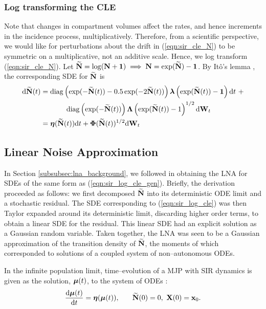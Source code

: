 \subsubsection{Log transforming the CLE}
\label{subsubsec:log_cle}
Note that changes in compartment volumes affect the rates, and hence increments in the incidence process, multiplicatively. Therefore, from a scientific perspective, we would like for perturbations about the drift in (\ref{eqn:sir_cle_N}) to be symmetric on a multiplicative, not an additive scale. Hence, we log transform (\ref{eqn:sir_cle_N}). Let $ \widetilde{\mathbf{N}} = \log(\mathbf{N} + \boldsymbol{1}) \implies\mathbf{N} = \exp(\widetilde{\mathbf{N}}) - \boldsymbol{1}$. By It\^{o}'s lemma \cite{oksendal2003stochastic}, the corresponding SDE for $ \widetilde{\mathbf{N}} $ is 
	\begin{align}
\label{eqn:sir_log_cle}
\mathrm{d}\widetilde{\mathbf{N}}(t) &= \mathrm{diag}\left (\exp(-\widetilde{\mathbf{N}}(t)) - 0.5\exp(-2\widetilde{\mathbf{N}}(t))\right )\boldsymbol{\lambda}\left (\exp(\widetilde{\mathbf{N}}(t))-\boldsymbol{1}\right )\mathrm{d} t\ + \nonumber\\
& \hspace{0.5in} \mathrm{diag}\left (\exp(-\widetilde{\mathbf{N}}(t))\right )\boldsymbol{\Lambda}\left (\exp(\widetilde{\mathbf{N}}(t))-1\right )^{1/2}\mathrm{d}\mathbf{W}_t \\
\label{eqn:sir_log_cle_gen}
&= \boldsymbol{\eta}(\widetilde{\mathbf{N}}(t))\mathrm{d} t + \boldsymbol{\Phi}(\widetilde{\mathbf{N}}(t))^{1/2}\mathrm{d}\mathbf{W}_t
\end{align}

\subsection{Linear Noise Approximation}
\label{subsec:sir_lna}

In Section \ref{subsubsec:lna_background}, we followed \cite{fearnhead2014,golightly2013simulation,golightly2015delayed} in obtaining the LNA for SDEs of the same form as (\ref{eqn:sir_log_cle_gen}). Briefly, the derivation proceeded as follows: we first decomposed $ \widetilde{\mathbf{N}} $ into its deterministic ODE limit and a stochastic residual. The SDE corresponding to  (\ref{eqn:sir_log_cle}) was then Taylor expanded around its deterministic limit, discarding higher order terms, to obtain a linear SDE for the residual. This linear SDE had an explicit solution as a Gaussian random variable. Taken together, the LNA was seen to be a Gaussian approximation of the transition density of $ \widetilde{\mathbf{N}} $, the moments of which corresponded to solutions of a coupled system of non--autonomous ODEs.

In the infinite population limit, time--evolution of a MJP with SIR dynamics is given as the solution, $ \boldsymbol{\mu}(t) $, to the system of ODEs \cite{allen2008introduction,fuchs2013inference}:
\begin{equation}
\label{eqn:lna_ode_drift}
\frac{\mathrm{d}\boldsymbol{\mu}(t)}{\mathrm{d} t} = \boldsymbol{\eta}(\boldsymbol{\mu}(t)),\hspace{0.25in} \widetilde{\mathbf{N}}(0) = 0,\ \mathbf{X}(0) = \mathbf{x}_0.
\end{equation}

